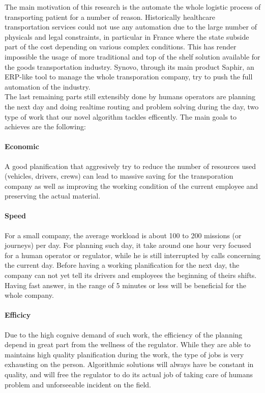 \documentclass[12pt]{memoir}
\begin{document}
\label{sec:Context of research}
\bigskip
The main motivation of this research is the automate the whole logistic process of
transporting patient for a number of reason. Historically healthcare transportation
services could not use any automation due to the large number of physicals and legal
constraints, in particular in France where the state subside part of the cost
depending on various complex conditions. This has render impossible the usage of
more traditional and top of the shelf solution available for the goods
transportation industry. Synovo, through its main product Saphir, an ERP-like tool
to manage the whole transporation company, try to push the full automation of the
industry. \\
The last remaining parts still extensibly done by humans operators are planning the
next day and doing realtime routing and problem solving during the day, two type of
work that our novel algorithm tackles efficently. The main goals to achieves are the
following:
\paragraph{Economic} %
\label{par:Economic}
A good planification that aggresively try to reduce the number of resources used
(vehicles, drivers, crews) can lead to massive saving for the transporation company
as well as improving the working condition of the current employee and preserving
the actual material.
\paragraph{Speed} %
\label{par:Speed}
For a small company, the average workload is about 100 to 200 missions (or journeys)
per day. For planning such day, it take around one hour very focused for a human
operator or regulator, while he is still interrupted by calls concerning the current
day. Before having a working planification for the next day, the company can not yet
tell its drivers and employees the beginning of theirs shifts. Having fast answer,
in the range of 5 minutes or less will be beneficial for the whole company.
\paragraph{Efficicy} %
\label{par:Efficicy}
Due to the high cognive demand of such work, the efficiency of the planning depend
in great part from the wellness of the regulator. While they are able to maintains
high quality planification during the work, the type of jobs is very exhausting on
the person. Algorithmic solutions will always have be constant in quality, and will
free the regulator to do its actual job of taking care of humans problem and
unforseeable incident on the field.
\end{document}

